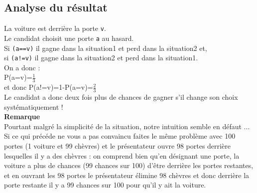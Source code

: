 \documentclass[a4paper,11pt]{book}
\begin{document}
\subsection{Analyse du r\'esultat}
La voiture est derri\`ere la porte {\tt v}.\\
Le candidat choisit une porte {\tt a} au hasard.\\
Si {\tt (a==v)} il gagne dans la situation1 et perd dans la situation2 et,\\
si {\tt (a!=v)} il gagne dans la situation2 et perd dans la situation1.\\
On a  donc :\\
P(a=v)=$\displaystyle \frac{1}{3}$\\  
et donc P(a!=v)=1-P(a=v)=$\displaystyle \frac{2}{3}$ \\
Le candidat a donc deux fois plus de chances de gagner s'il change son choix 
syst\'ematiquement !\\
{\bf Remarque} \\
Pourtant malgr\'e la simplicit\'e de la situation, notre intuition semble en 
d\'efaut ...\\
Si ce qui pr\'ec\'ede ne vous a pas convaincu faites le m\^eme probl\`eme avec
 100 portes (1 voiture et 99 ch\`evres) et le pr\'esentateur ouvre 98 portes 
derri\`ere lesquelles il y a des ch\`evres : on comprend bien qu'en d\'esignant
 une porte, la voiture a plus de chances (99 chances sur 100)
d'\^etre derri\`ere les portes restantes, et en ouvrant les 98 portes le 
pr\'esentateur \'elimine 98 ch\`evres et donc derri\`ere la porte restante il 
y a  99 chances sur 100 pour qu'il y ait la voiture.
\end{document}
